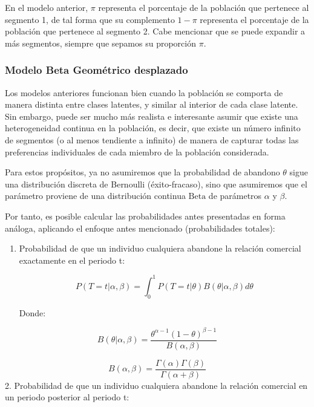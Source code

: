 \documentclass[
]{book}
\begin{document}
En el modelo anterior, \(\pi\) representa el porcentaje de la población
que pertenece al segmento 1, de tal forma que su complemento \(1-\pi\)
representa el porcentaje de la población que pertenece al segmento 2.
Cabe mencionar que se puede expandir a más segmentos, siempre que
sepamos su proporción \(\pi\).

\subsubsection*{Modelo Beta Geométrico desplazado}\label{modelo-beta-geomuxe9trico-desplazado}

Los modelos anteriores funcionan bien cuando la población se comporta de
manera distinta entre clases latentes, y similar al interior de cada
clase latente. Sin embargo, puede ser mucho más realista e interesante
asumir que existe una heterogeneidad continua en la población, es decir,
que existe un número infinito de segmentos (o al menos tendiente a
infinito) de manera de capturar todas las preferencias individuales de
cada miembro de la población considerada.

Para estos propósitos, ya no asumiremos que la probabilidad de abandono
\(\theta\) sigue una distribución discreta de Bernoulli (éxito-fracaso),
sino que asumiremos que el parámetro proviene de una distribución
continua \(\text{Beta}\) de parámetros \(\alpha\) y \(\beta\).

Por tanto, es posible calcular las probabilidades antes presentadas en
forma análoga, aplicando el enfoque antes mencionado (probabilidades
totales):

\begin{enumerate}
\def\labelenumi{\arabic{enumi}.}
\item
  Probabilidad de que un individuo cualquiera abandone la relación
  comercial exactamente en el periodo t:

  \[P(T=t|\alpha,\beta) = \int_0^1 P(T=t|\theta)B(\theta|\alpha,\beta)d\theta\]

  Donde:
\end{enumerate}

\[B(\theta|\alpha,\beta) = \frac{\theta^{\alpha-1}(1-\theta)^{\beta-1}}{B(\alpha,\beta)}\]

\[B(\alpha,\beta) = \frac{\Gamma(\alpha)\Gamma(\beta)}{\Gamma(\alpha + \beta)}\]
2. Probabilidad de que un individuo cualquiera abandone la relación
comercial en un periodo posterior al periodo t:
\end{document}
